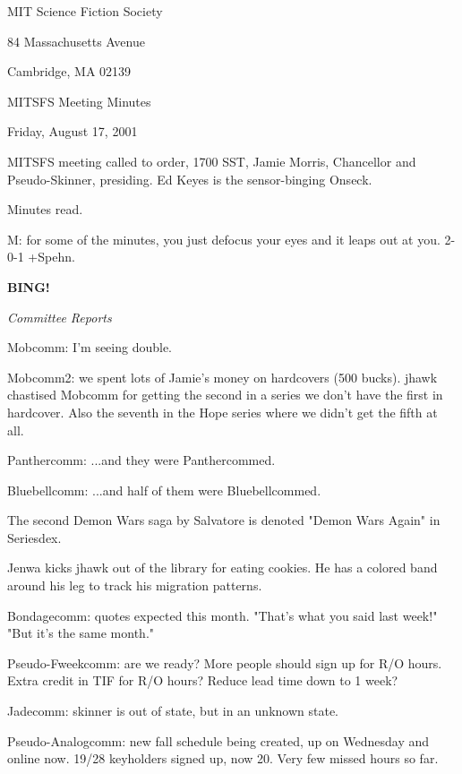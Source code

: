 \documentclass[12pt]{article}
\newcommand{\bing}{{\bf BING!} }
\newcommand{\goto}[1]{\bing \vskip 12pt \centerline{{\em{#1}}}}
\begin{document}
\begin{center}

MIT Science Fiction Society 

84 Massachusetts Avenue

Cambridge, MA 02139

\vspace{12pt}

MITSFS Meeting Minutes 

Friday, August 17, 2001

\end{center}
 
\vspace{18pt}

\setlength{\parskip}{6pt}

\noindent
MITSFS meeting called to order, 1700 SST, Jamie Morris, Chancellor and Pseudo-Skinner, presiding.  Ed Keyes is the sensor-binging Onseck.

Minutes read.

M: for some of the minutes, you just defocus your eyes and it leaps out at you. 2-0-1 +Spehn.

\goto{Committee Reports}

Mobcomm: I'm seeing double.

Mobcomm2: we spent lots of Jamie's money on hardcovers (500 bucks). jhawk chastised Mobcomm for getting the second in a series we don't have the first in hardcover. Also the seventh in the Hope series where we didn't get the fifth at all.

Panthercomm: ...and they were Panthercommed.

Bluebellcomm: ...and half of them were Bluebellcommed.

The second Demon Wars saga by Salvatore is denoted "Demon Wars Again" in Seriesdex.

Jenwa kicks jhawk out of the library for eating cookies. He has a colored band around his leg to track his migration patterns.

Bondagecomm: quotes expected this month. "That's what you said last week!" "But it's the same month."

Pseudo-Fweekcomm: are we ready? More people should sign up for R/O hours. Extra credit in TIF for R/O hours? Reduce lead time down to 1 week?

Jadecomm: skinner is out of state, but in an unknown state.

Pseudo-Analogcomm: new fall schedule being created, up on Wednesday and online now. 19/28 keyholders signed up, now 20. Very few missed hours so far.
\end{document}
